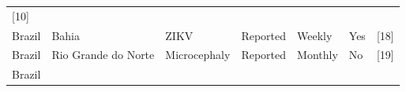 \documentclass[10pt,letterpaper]{article}
\begin{document}
\begin{longtable}[]{@{}lllllll@{}}
\begin{minipage}[t]{0.08\columnwidth}
{[}10{]}\strut
\end{minipage}\tabularnewline
\begin{minipage}[t]{0.03\columnwidth}\raggedright\strut
Brazil\strut
\end{minipage} & \begin{minipage}[t]{0.37\columnwidth}\raggedright\strut
Bahia\strut
\end{minipage} & \begin{minipage}[t]{0.08\columnwidth}\raggedright\strut
ZIKV\strut
\end{minipage} & \begin{minipage}[t]{0.17\columnwidth}\raggedright\strut
Reported\strut
\end{minipage} & \begin{minipage}[t]{0.04\columnwidth}\raggedright\strut
Weekly\strut
\end{minipage} & \begin{minipage}[t]{0.04\columnwidth}\raggedright\strut
Yes\strut
\end{minipage} & \begin{minipage}[t]{0.08\columnwidth}\raggedright\strut
{[}18{]}\strut
\end{minipage}\tabularnewline
\begin{minipage}[t]{0.03\columnwidth}\raggedright\strut
Brazil\strut
\end{minipage} & \begin{minipage}[t]{0.37\columnwidth}\raggedright\strut
Rio Grande do Norte\strut
\end{minipage} & \begin{minipage}[t]{0.08\columnwidth}\raggedright\strut
Microcephaly\strut
\end{minipage} & \begin{minipage}[t]{0.17\columnwidth}\raggedright\strut
Reported\strut
\end{minipage} & \begin{minipage}[t]{0.04\columnwidth}\raggedright\strut
Monthly\strut
\end{minipage} & \begin{minipage}[t]{0.04\columnwidth}\raggedright\strut
No\strut
\end{minipage} & \begin{minipage}[t]{0.08\columnwidth}\raggedright\strut
{[}19{]}\strut
\end{minipage}\tabularnewline
\begin{minipage}[t]{0.03\columnwidth}\raggedright\strut
Brazil\strut
\end{minipage} & \begin{minipage}[t]{0.37\columnwidth}\raggedright\strut

\end{minipage}
\end{longtable}
\end{document}
